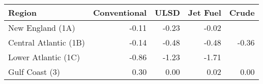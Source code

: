 \begin{tabular}{lrrrr}
  \hline
Region & Conventional & ULSD & Jet Fuel & Crude \\ 
  \hline
New England (1A) & -0.11 & -0.23 & -0.02 &  \\ 
  Central Atlantic (1B) & -0.14 & -0.48 & -0.48 & -0.36 \\ 
  Lower Atlantic (1C) & -0.86 & -1.23 & -1.71 &  \\ 
  Gulf Coast (3) & 0.30 & 0.00 & 0.02 & 0.00 \\ 
   \hline
\end{tabular}
